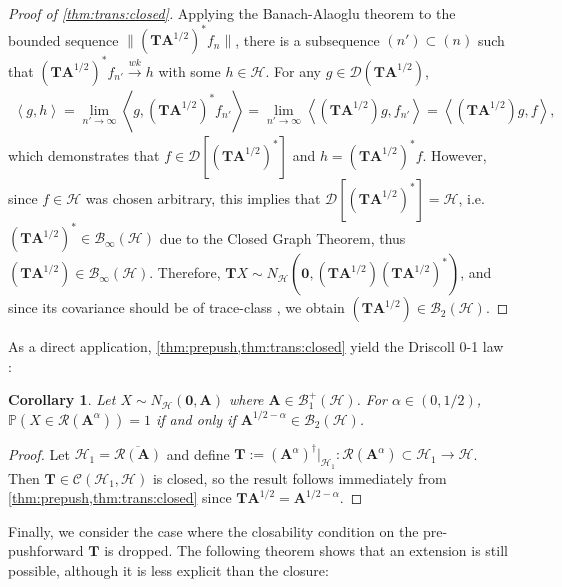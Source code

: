 \documentclass[noinfoline]{imsart}\setcounter{tocdepth}{2}
\renewcommand{\b}[1]{\mathbb{#1}} %
\newcommand{\m}[1]{\mathbf{#1}} %
\renewcommand{\c}[1]{\mathcal{#1}} %
\newcommand{\innpr}[2]{{\left\langle {#1},{#2}\right\rangle}} %
\theoremstyle{plain}
\newtheorem{corollary}[theorem]{Corollary}
\begin{document}
\begin{proof}[Proof of \cref{thm:trans:closed}]
Applying the Banach-Alaoglu theorem \cite{conway2019course} to the bounded sequence $\|(\m{T} \m{A}^{1/2})^{*} f_{n} \|$, there is a subsequence $(n') \subset (n)$ such that $(\m{T} \m{A}^{1/2})^{*} f_{n'} \stackrel{wk}{\rightarrow} h$ with some $h \in \c{H}$. For any $g \in \c{D}(\m{T} \m{A}^{1/2})$,
\begin{align*}
    \innpr{g}{h} = \lim_{n' \rightarrow \infty} \innpr{g}{(\m{T} \m{A}^{1/2})^{*} f_{n'}} = \lim_{n' \rightarrow \infty} \innpr{(\m{T} \m{A}^{1/2}) g}{f_{n'}} = \innpr{(\m{T} \m{A}^{1/2}) g}{f},
\end{align*}
which demonstrates that $f \in \c{D}[(\m{T} \m{A}^{1/2})^{*}]$ and $h = (\m{T} \m{A}^{1/2})^{*} f$. However, since $f \in \c{H}$ was chosen arbitrary, this implies that $\c{D}[(\m{T} \m{A}^{1/2})^{*}] = \c{H}$, i.e. $(\m{T} \m{A}^{1/2})^{*} \in \c{B}_{\infty}(\c{H})$ due to the Closed Graph Theorem, thus $(\m{T} \m{A}^{1/2}) \in \c{B}_{\infty}(\c{H})$. Therefore, $\m{T} X \sim N_{\c{H}}(\m{0}, (\m{T} \m{A}^{1/2})(\m{T} \m{A}^{1/2})^{*})$, and since its covariance should be of trace-class \cite{da2006introduction}, we obtain $(\m{T} \m{A}^{1/2}) \in \c{B}_{2}(\c{H})$.
\end{proof}

As a direct application, \cref{thm:prepush,thm:trans:closed} yield the Driscoll 0-1 law  \cite{driscoll1973reproducing, lukic2001stochastic}:

\begin{corollary}
Let $X \sim N_{\c{H}}(\m{0}, \m{A})$ where $\m{A} \in \c{B}_{1}^{+}(\c{H})$. For $\alpha \in (0, 1/2)$, $\b{P}(X \in \c{R}(\m{A}^{\alpha}))=1$ if and only if $\m{A}^{1/2-\alpha} \in \c{B}_{2}(\c{H})$.
\end{corollary}
\begin{proof}
Let $\c{H}_{1} = \overline{\c{R}(\m{A})}$ and define $\m{T} := (\m{A}^{\alpha})^{\dagger} \vert_{\c{H}_{1}} : \c{R}(\m{A}^{\alpha}) \subset \c{H}_{1} \to \c{H}$. Then $\m{T} \in \c{C}(\c{H}_{1}, \c{H})$ is closed, so the result follows immediately from \cref{thm:prepush,thm:trans:closed} since $\m{T} \m{A}^{1/2} = \m{A}^{1/2-\alpha}$. 
\end{proof}

Finally, we consider the case where the closability condition on the pre-pushforward $\m{T}$ is dropped. The following theorem shows that an extension is still possible, although it is less explicit than the closure:
\end{document}
